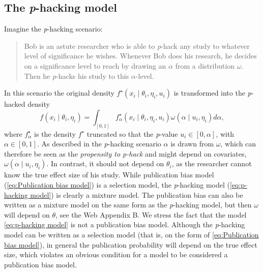 \documentclass[useAMS,usenatbib,referee]{biom}
\begin{document}
\subsection{The \textit{p}-hacking model}\label{subsect:p-hacking}
Imagine the \textit{p}-hacking scenario:
\begin{quote}
Bob is an astute researcher who is able to \textit{p}-hack any study to whatever level of significance he wishes. Whenever Bob does his research, he decides on a significance level to reach by drawing an $\alpha$ from a distribution $\omega$. Then he \textit{p}-hacks his study to this $\alpha$-level.
\end{quote}
In this scenario the original density $f^{\star}(x_{i}\mid\theta_{i},\eta_{i}, u_i)$
is transformed into the \textit{p}-hacked density
\begin{equation}\label{eq:p-hacking model}
f(x_{i}\mid\theta_{i},\eta_{i})=\int_{[0,1]}f_\alpha^{\star}(x_{i}\mid\theta_{i},\eta_{i}, u_i)\omega(\alpha\mid u_i, \eta_i)d\alpha,
\end{equation}
where $f_\alpha^{\star}$ is the density $f^{\star}$ truncated so that the \textit{p}-value $u_i\in\left[0,\alpha\right]$, with $\alpha \in [0,1]$. As described in the \textit{p}-hacking scenario $\alpha$ is drawn from $\omega$, which can therefore be seen as the \emph{propensity to p-hack} and might depend on covariates, $\omega(\alpha \mid u_i, \eta_i)$. In contrast, it should not depend on $\theta_{i}$, as the researcher cannot know the true effect size of his study. While publication bias model (\ref{eq:Publication bias model}) is a selection model, the \textit{p}-hacking model (\ref{eq:p-hacking model}) is clearly a mixture model. The publication bias can also be written as a mixture model on the same form as the \textit{p}-hacking model, but then $\omega$ will depend on $\theta$, see the Web Appendix B. We stress the fact that the model \eqref{eq:p-hacking model} is not a publication bias model. Although the \textit{p}-hacking model can be written as a selection model (that is, on the form of \eqref{eq:Publication bias model}), in general the publication probability will depend on the true effect size, which violates an obvious condition for a model to be considered a publication bias model.
\end{document}
